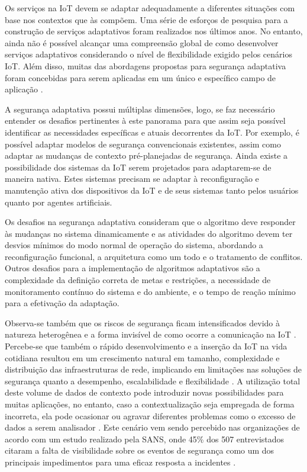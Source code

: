 \documentclass[tid,table]{texufpel} %
\begin{document}
Os serviços na IoT devem se adaptar adequadamente a diferentes situações com base nos contextos que às compõem. Uma série de esforços de pesquisa para a construção de serviços adaptativos foram realizados nos últimos anos. No entanto, ainda não é possível alcançar uma compreensão global de como desenvolver serviços adaptativos considerando o nível de flexibilidade exigido pelos cenários IoT. Além disso, muitas das abordagens propostas para segurança adaptativa foram concebidas para serem aplicadas em um único e específico campo de aplicação \cite{miorandi12}.

A segurança adaptativa possui múltiplas dimensões, logo, se faz necessário entender os desafios pertinentes à este panorama para que assim seja possível identificar as necessidades específicas e atuais decorrentes da IoT. Por exemplo, é possível adaptar modelos de segurança convencionais existentes, assim como adaptar as mudanças de contexto pré-planejadas de segurança. Ainda existe a possibilidade dos sistemas da IoT serem projetados para adaptarem-se de maneira nativa. Estes sistemas precisam se adaptar à reconfiguração e manutenção ativa dos dispositivos da IoT e de seus sistemas tanto pelos usuários quanto por agentes artificiais.

Os desafios na segurança adaptativa consideram que o algoritmo deve responder às mudanças no sistema dinamicamente e as atividades do algoritmo devem ter desvios mínimos do modo normal de operação do sistema, abordando a reconfiguração funcional, a arquitetura como um todo e o tratamento de conflitos. Outros desafios para a implementação de algoritmos adaptativos são a complexidade da definição correta de metas e restrições, a necessidade de monitoramento contínuo do sistema e do ambiente, e o tempo de reação mínimo para a efetivação da adaptação.

Observa-se também que os riscos de segurança ficam intensificados devido à natureza heterogênea e a forma invisível de como ocorre a comunicação na IoT \cite{langheinrich10}. Percebe-se que também o rápido desenvolvimento e a inserção da IoT na vida cotidiana resultou em um  crescimento natural em tamanho, complexidade e distribuição das infraestruturas de rede, implicando em limitações nas soluções de segurança quanto a desempenho, escalabilidade e flexibilidade \cite{onwubiko12, liu08, ghorbani10, hu14}.  A utilização total deste volume de dados de contexto pode introduzir novas possibilidades para muitas aplicações, no entanto, caso a contextualização seja empregada de forma incorreta, ela pode ocasionar ou agravar diferentes problemas como o excesso de dados a serem analisador \cite{li15}. Este cenário vem sendo percebido nas organizações de acordo com um estudo realizado pela SANS, onde 45\% dos 507 entrevistados citaram a falta de visibilidade sobre os eventos de segurança como um dos principais impedimentos para uma eficaz resposta a incidentes \cite{sansir15}.
 
\end{document}
